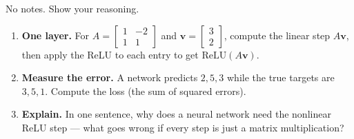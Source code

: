 \documentclass[10pt]{article}
\newcommand{\vv}{\mathbf{v}}
\newcommand{\relu}{\mathrm{ReLU}}
\begin{document}
\namedateperiod

\vspace{0.15in}

No notes. Show your reasoning.

\begin{enumerate}[leftmargin=1.8em, itemsep=16pt]
  \item \textbf{One layer.} For $A=\begin{bmatrix} 1 & -2 \\ 1 & 1 \end{bmatrix}$ and
        $\vv=\begin{bmatrix} 3 \\ 2 \end{bmatrix}$, compute the linear step $A\vv$, then apply the ReLU to
        each entry to get $\relu(A\vv)$.
        \vspace{1.3cm}
  \item \textbf{Measure the error.} A network predicts $2,5,3$ while the true targets are $3,5,1$. Compute
        the loss (the sum of squared errors).
        \vspace{1.2cm}
  \item \textbf{Explain.} In one sentence, why does a neural network need the nonlinear ReLU step ---
        what goes wrong if every step is just a matrix multiplication?
\end{enumerate}
\end{document}
